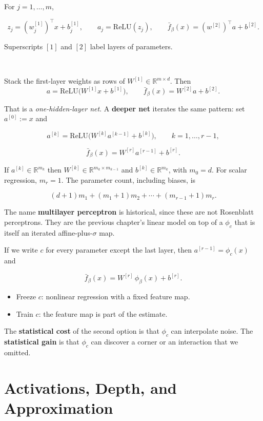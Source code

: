 \documentclass[
]{book}
\begin{document}
For \(j=1,\ldots,m\),

\[
z_j=(w_j^{[1]})^\top x+b_j^{[1]},
\qquad
a_j=\mathrm{ReLU}(z_j),
\qquad
\bar f_\beta(x)=(w^{[2]})^\top a+b^{[2]}.
\]

Superscripts \([1]\) and \([2]\) label layers of parameters.

~

Stack the first-layer weights as rows of \(W^{[1]}\in\mathbb{R}^{m\times d}\). Then
\[
a=\mathrm{ReLU}\bigl(W^{[1]}x+b^{[1]}\bigr),
\qquad
\bar f_\beta(x)=W^{[2]}a+b^{[2]}.
\]

That is a \emph{one-hidden-layer net}. A \textbf{deeper net} iterates the same pattern: set \(a^{[0]}:=x\) and

\[
a^{[k]}=\mathrm{ReLU}\bigl(W^{[k]}a^{[k-1]}+b^{[k]}\bigr),
\qquad k=1,\ldots,r-1,
\]

\[
\bar f_\beta(x)=W^{[r]}a^{[r-1]}+b^{[r]}.
\]

If \(a^{[k]}\in\mathbb{R}^{m_k}\) then \(W^{[k]}\in\mathbb{R}^{m_k\times m_{k-1}}\) and \(b^{[k]}\in\mathbb{R}^{m_k}\), with \(m_0=d\). For scalar regression, \(m_r=1\). The parameter count, including biases, is

\[
(d+1)m_1+(m_1+1)m_2+\cdots+(m_{r-1}+1)m_r.
\]

The name \textbf{multilayer perceptron} is historical, since these are not Rosenblatt perceptrons. They are the previous chapter's linear model on top of a \(\phi_c\) that is itself an iterated affine-plus-\(\sigma\) map.

If we write \(c\) for every parameter except the last layer, then \(a^{[r-1]}=\phi_c(x)\) and

\[
\bar f_\beta(x)=W^{[r]}\,\phi_\beta(x)+b^{[r]}.
\]

\begin{itemize}
\item
  Freeze \(c\): nonlinear regression with a fixed feature map.
\item
  Train \(c\): the feature map is part of the estimate.
\end{itemize}

The \textbf{statistical cost} of the second option is that \(\phi_c\) can interpolate noise. The \textbf{statistical gain} is that \(\phi_c\) can discover a corner or an interaction that we omitted.

\section{Activations, Depth, and Approximation}\label{activations-depth-and-approximation}
\end{document}
